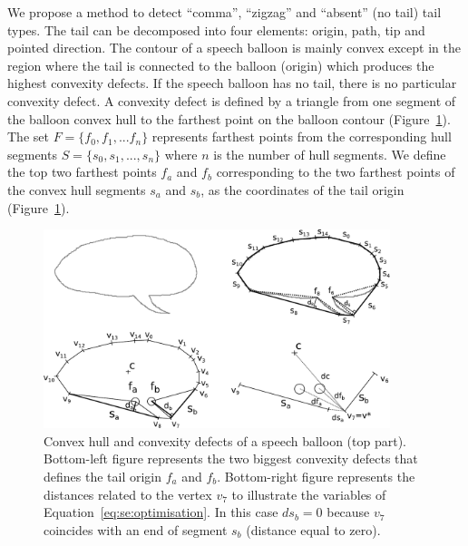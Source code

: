 

We propose a method to detect ``comma'', ``zigzag'' and ``absent'' (no tail) tail types.
The tail can be decomposed into four elements: origin, path, tip and pointed direction.
The contour of a speech balloon is mainly convex except in the region where the tail is connected to the balloon (origin) which produces the highest convexity defects.
If the speech balloon has no tail, there is no particular convexity defect.
A convexity defect is defined by a triangle from one segment of the balloon convex hull to the farthest point on the balloon contour (Figure~\ref{fig:se:convexity_defects}).
The set $F=\{f_0,f_1,...f_n\}$ represents farthest points from the corresponding hull segments $S=\{s_0, s_1,...,s_n\}$ where $n$ is the number of hull segments.
We define the top two farthest points $f_a$ and $f_b$ corresponding to the two farthest points of the convex hull segments $s_a$ and $s_b$, as the coordinates of the tail origin (Figure~\ref{fig:se:convexity_defects}).

    \begin{figure}[ht]%
      \centering
      \includegraphics[width=0.9\textwidth]{tail_description.pdf}
    \caption[Convex hull and convexity defects of a speech balloon]{Convex hull and convexity defects of a speech balloon (top part). Bottom-left figure represents the two biggest convexity defects that defines the tail origin $f_a$ and $f_b$. Bottom-right figure represents the distances related to the vertex $v_7$ to illustrate the variables of Equation~\ref{eq:se:optimisation}. In this case $ds_b=0$ because $v_7$ coincides with an end of segment $s_b$ (distance equal to zero).}
    \label{fig:se:convexity_defects}
    \end{figure}

